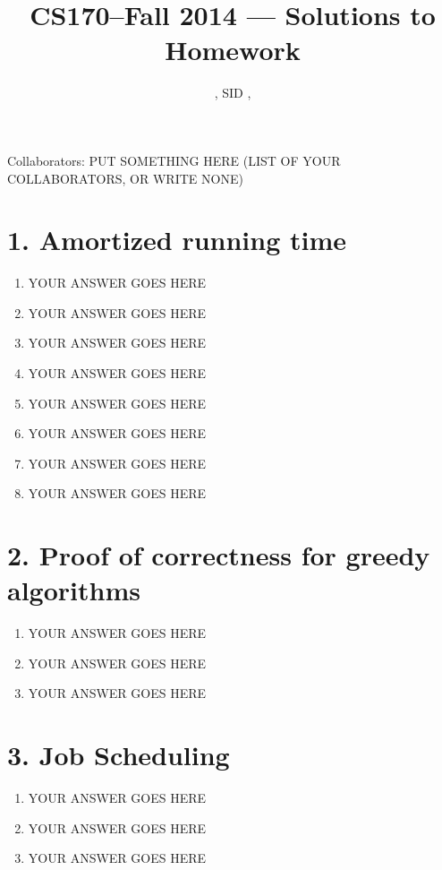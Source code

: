 \documentclass[11pt]{article}
\title{CS170--Fall 2014 --- Solutions to Homework \Homework}
\author{\Name, SID \SID, \texttt{\Login}}
\newenvironment{qparts}{\begin{enumerate}[{(}a{)}]}{\end{enumerate}}
\begin{document}
\maketitle

\noindent
Collaborators: PUT SOMETHING HERE (LIST OF YOUR COLLABORATORS, OR WRITE NONE)

\section*{1. Amortized running time}
\begin{qparts}
\item
YOUR ANSWER GOES HERE

\item
YOUR ANSWER GOES HERE

\item
YOUR ANSWER GOES HERE

\item
YOUR ANSWER GOES HERE

\item
YOUR ANSWER GOES HERE

\item
YOUR ANSWER GOES HERE

\item
YOUR ANSWER GOES HERE

\item
YOUR ANSWER GOES HERE
\end{qparts}



\newpage
\section*{2. Proof of correctness for greedy algorithms}
\begin{qparts}
\item
YOUR ANSWER GOES HERE

\item
YOUR ANSWER GOES HERE

\item
YOUR ANSWER GOES HERE

\end{qparts}


\newpage
\section*{3. Job Scheduling}
\begin{qparts}
\item
YOUR ANSWER GOES HERE

\item
YOUR ANSWER GOES HERE

\item
YOUR ANSWER GOES HERE

\end{qparts}
\end{document}
